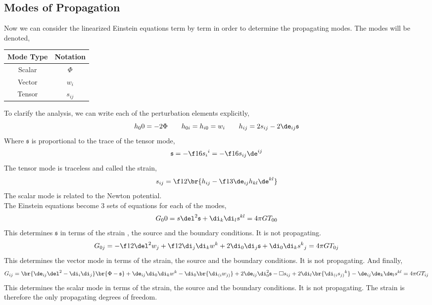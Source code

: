 \documentclass{article}
\begin{document}
\subsection{Modes of Propagation}
Now we can consider the linearized Einstein equations term by term in order to determine the propagating modes. The modes will be denoted,
\begin{center}
    \begin{tabular}{|c|c|}
        \hline
        Mode Type & Notation \\
        \hline
        Scalar & $\Phi$ \\
        Vector & $w_i$ \\
        Tensor & $s_{ij}$ \\
        \hline
    \end{tabular}
\end{center}
\newcommand{\gs}{\mathfrak{s}}
To clarify the analysis, we can write each of the perturbation elements explicitly,
\[ h_00 = - 2 \Phi \qquad h_{0i} = h_{i0} = w_i \qquad h_{ij} = 2 s_{ij} - 2\de_{ij} \mathfrak{s} \]
Where $\gs$ is proportional to the trace of the tensor mode,
\[ \gs = -\f16 {s_{i}}^i = -\f16 s_{ij}\de^{ij} \]
The tensor mode is traceless and called the strain,
\[ s_{ij} = \f12\br{h_{ij} - \f13 \de_{ij}h_{kl}\de^{kl}} \]
The scalar mode is related to the Newton potential.\\

The Einstein equations become 3 sets of equations for each of the modes,
\[ G_00 = s\del^2\gs + \di_k\di_ls^{kl} = 4 \pi G T_{00} \]
This determines $\gs$ in terms of the strain , the source and the boundary conditions. It is not propagating.
\[ G_{0j} = -\f12 \del^2 w_j + \f12 \di_j \di_k w^k + 2 \di_0 \di_j \gs + \di_0\di_k {s^{k}}_j = 4 \pi G T_{0j} \]
This determines the vector mode in terms of the strain, the source and the boundary conditions. It is not propagating. And finally,
\[ G_{ij} = \br{\de_{ij}\del^2 - \di_i\di_j}\br{\Phi - \gs} + \de_{ij} \di_0\di_k w^k - \di_0\br{\di_{(i}w_{j)}} + 2\de_{ij}\di_0^2\gs - \Box s_{ij} + 2 \di_l\br{\di_{(i}{s_{j)}}^k} - \de_{ij}\de_k\de_ls^{kl} = 4 \pi G T_{ij} \]
This determines the scalar mode in terms of the strain, the source and the boundary conditions. It is not propagating. The strain is therefore the only propagating degrees of freedom.
\end{document}
